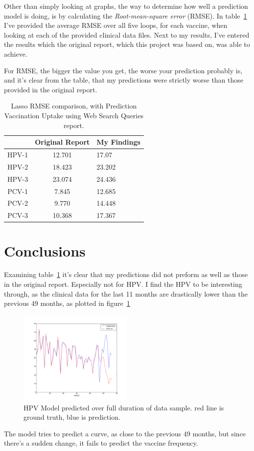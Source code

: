 \documentclass{sig-alternate}
\begin{document}
Other than simply looking at graphs, the way to determine how well a prediction model is doing, is by calculating the \textit{Root-mean-square error} (RMSE). In table~\ref{table:RMSE} I've provided the average RMSE over all five loops, for each vaccine, when looking at each of the provided clinical data files. Next to my results, I've entered the results which the original report\cite{H2016}, which this project was based on, was able to achieve.

For RMSE, the bigger the value you get, the worse your prediction probably is, and it's clear from the table, that my predictions were strictly worse than those provided in the original report.

\begin{table}[h!]
\centering
\caption{Lasso RMSE comparison, with Prediction Vaccination Uptake using Web Search Queries report.}
\begin{tabular}{|c|c|l|} \hline
& Original Report & My Findings \\ \hline
HPV-1 & 12.701 & 17.07 \\
HPV-2 & 18.423 &  23.202 \\
HPV-3 & 23.074 & 24.436 \\\hline
PCV-1 & 7.845 & 12.685 \\
PCV-2 & 9.770 & 14.448 \\
PCV-3 & 10.368 & 17.367\\
\hline\end{tabular}
\label{table:RMSE}
\end{table}

\section{Conclusions}
Examining table~\ref{table:RMSE} it's clear that my predictions did not preform as well as those in the original report. 
Especially not for HPV. I find the HPV to be interesting through, as the clinical data for the last 11 months are drastically lower than the previous 49 months, as plotted in figure~\ref{fig:HPV_FULL}
\begin{figure}[h!]
\centering
\includegraphics[width=0.5\textwidth]{hpv_full_prediction}
\caption{HPV Model predicted over full duration of data sample. red line is ground truth, blue is prediction.}
\label{fig:HPV_FULL}
\end{figure}
The model tries to predict a curve, as close to the previous 49 months, but since there's a sudden change, it fails to predict the vaccine frequency.
\end{document}

